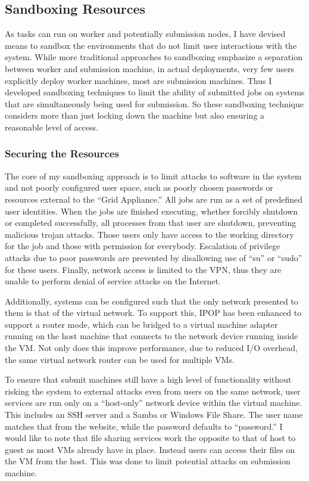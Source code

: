 \subsection{Sandboxing Resources}

As tasks can run on worker and potentially submission nodes, I have devised
means to sandbox the environments that do not limit user interactions with the
system.  While more traditional approaches to sandboxing emphasize a separation
between worker and submission machine, in actual deployments, very few users
explicitly deploy worker machines, most are submission machines.  Thus I
developed sandboxing techniques to limit the ability of submitted jobs on
systems that are simultaneously being used for submission.  So these sandboxing
technique considers more than just locking down the machine but also ensuring a
reasonable level of access.

\subsubsection{Securing the Resources}

The core of my sandboxing approach is to limit attacks to software in the
system and not poorly configured user space, such as poorly chosen passwords or
resources external to the ``Grid Appliance.''  All jobs are run as a set of
predefined user identities.  When the jobs are finished executing, whether
forcibly shutdown or completed successfully, all processes from that user are
shutdown, preventing malicious trojan attacks.  Those users only have access to
the working directory for the job and those with permission for everybody.
Escalation of privilege attacks due to poor passwords are prevented by
disallowing use of ``su'' or ``sudo'' for these users.  Finally, network access
is limited to the VPN, thus they are unable to perform denial of service
attacks on the Internet.

Additionally, systems can be configured such that the only network presented to
them is that of the virtual network.  To support this, IPOP has been enhanced to
support a router mode, which can be bridged to a virtual machine adapter
running on the host machine that connects to the network device running inside
the VM.  Not only does this improve performance, due to reduced I/O overhead,
the same virtual network router can be used for multiple VMs.

To ensure that submit machines still have a high level of functionality without
risking the system to external attacks even from users on the same network,
user services are run only on a ``host-only'' network device within the virtual
machine.  This includes an SSH server and a Samba or Windows File Share.  The
user name matches that from the website, while the password defaults to
``password.''  I would like to note that file sharing services work the
opposite to that of host to guest as most VMs already have in place.  Instead
users can access their files on the VM from the host.  This was done to limit
potential attacks on submission machine.

